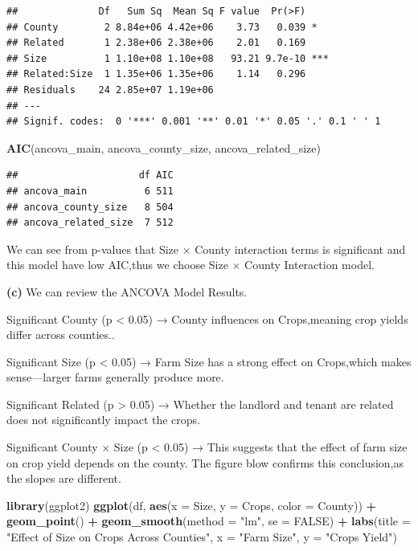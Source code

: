 \documentclass[
]{article}
\newenvironment{Shaded}{\begin{snugshade}}{\end{snugshade}}
\newcommand{\AttributeTok}[1]{\textcolor[rgb]{0.13,0.29,0.53}{#1}}
\newcommand{\ConstantTok}[1]{\textcolor[rgb]{0.56,0.35,0.01}{#1}}
\newcommand{\FunctionTok}[1]{\textcolor[rgb]{0.13,0.29,0.53}{\textbf{#1}}}
\newcommand{\NormalTok}[1]{#1}
\newcommand{\SpecialCharTok}[1]{\textcolor[rgb]{0.81,0.36,0.00}{\textbf{#1}}}
\newcommand{\StringTok}[1]{\textcolor[rgb]{0.31,0.60,0.02}{#1}}
\begin{document}
\begin{verbatim}
##              Df   Sum Sq  Mean Sq F value  Pr(>F)    
## County        2 8.84e+06 4.42e+06    3.73   0.039 *  
## Related       1 2.38e+06 2.38e+06    2.01   0.169    
## Size          1 1.10e+08 1.10e+08   93.21 9.7e-10 ***
## Related:Size  1 1.35e+06 1.35e+06    1.14   0.296    
## Residuals    24 2.85e+07 1.19e+06                    
## ---
## Signif. codes:  0 '***' 0.001 '**' 0.01 '*' 0.05 '.' 0.1 ' ' 1
\end{verbatim}

\begin{Shaded}
\begin{Highlighting}[]
\FunctionTok{AIC}\NormalTok{(ancova\_main, ancova\_county\_size, ancova\_related\_size)}
\end{Highlighting}
\end{Shaded}

\begin{verbatim}
##                     df AIC
## ancova_main          6 511
## ancova_county_size   8 504
## ancova_related_size  7 512
\end{verbatim}

We can see from p-values that Size × County interaction terms is
significant and this model have low AIC,thus we choose Size × County
Interaction model.

\textbf{(c)} We can review the ANCOVA Model Results.

Significant County (p \textless{} 0.05) → County influences on
Crops,meaning crop yields differ across counties..

Significant Size (p \textless{} 0.05) → Farm Size has a strong effect on
Crops,which makes sense---larger farms generally produce more.

Significant Related (p \textgreater{} 0.05) → Whether the landlord and
tenant are related does not significantly impact the crops.

Significant County × Size (p \textless{} 0.05) → This suggests that the
effect of farm size on crop yield depends on the county. The figure blow
confirms this conclusion,as the slopes are different.

\begin{Shaded}
\begin{Highlighting}[]
\FunctionTok{library}\NormalTok{(ggplot2)}
\FunctionTok{ggplot}\NormalTok{(df, }\FunctionTok{aes}\NormalTok{(}\AttributeTok{x =}\NormalTok{ Size, }\AttributeTok{y =}\NormalTok{ Crops, }\AttributeTok{color =}\NormalTok{ County)) }\SpecialCharTok{+}
  \FunctionTok{geom\_point}\NormalTok{() }\SpecialCharTok{+}
  \FunctionTok{geom\_smooth}\NormalTok{(}\AttributeTok{method =} \StringTok{"lm"}\NormalTok{, }\AttributeTok{se =} \ConstantTok{FALSE}\NormalTok{) }\SpecialCharTok{+}
  \FunctionTok{labs}\NormalTok{(}\AttributeTok{title =} \StringTok{"Effect of Size on Crops Across Counties"}\NormalTok{,}
       \AttributeTok{x =} \StringTok{"Farm Size"}\NormalTok{, }\AttributeTok{y =} \StringTok{"Crops Yield"}\NormalTok{)}
\end{Highlighting}
\end{Shaded}
\end{document}
